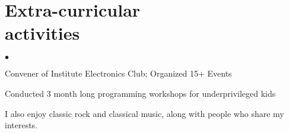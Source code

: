 \documentclass[margin,line, 9pt]{res}
\newenvironment{list2}{
  \begin{list}{$\bullet$}{%
      \setlength{\itemsep}{0.03in}
      \setlength{\parsep}{0in} \setlength{\parskip}{0in}
      \setlength{\topsep}{0in} \setlength{\partopsep}{0in} 
      \setlength{\leftmargin}{0.2in}}}{\end{list}}
\begin{document}
\section{\sc Extra-curricular \\ activities}
\begin{list2}
\item Convener of Institute Electronics Club; Organized 15+ Events
\item Conducted 3 month long programming workshops for underprivileged kids
\item I also enjoy classic rock and classical music, along with people who share my interests. 

\end{list2}


\end{document}
